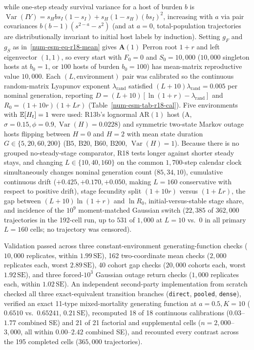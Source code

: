 while one-step steady survival variance for a host of burden $b$ is $\operatorname{Var}(I Y) = s_H b s_I(1 - s_I) + s_H(1 - s_H)(b s_I)^2$, increasing with $a$ via pair covariances $b(b - 1)(s^{2-a} - s^2)$ (and at $a = 0$, total-population trajectories are distributionally invariant to initial host labels by induction). Setting $g_F$ and $g_S$ as in~\eqref{num-esm-eq-r18-mean} gives $\mathbf{A}(1)$ Perron root $1 + r$ and left eigenvector $(1, 1)$, so every start with $F_0 = 0$ and $S_0 = 10{,}000$ ($10{,}000$ singleton hosts at $b_0 = 1$, or $100$ hosts of burden $b_0 = 100$) has mean-matrix reproductive value $10{,}000$. Each $(L, \text{environment})$ pair was calibrated so the continuous random-matrix Lyapunov exponent $\lambda_{\mathrm{rand}}$ satisfied $(L + 10)\lambda_{\mathrm{rand}} = 0.005$ per nominal generation, reporting $D = (L + 10)[\ln(1 + r) - \lambda_{\mathrm{rand}}]$ and $R_0 = (1 + 10r)(1 + Lr)$ (Table~\ref{num-esm-tab-r18-cal}). Five environments with $\mathbb{E}[H_t] = 1$ were used: R13b's lognormal $\mathrm{AR}(1)$ host ($\mathrm{A}$, $\sigma = 0.15, \phi = 0.9, \operatorname{Var}(H) = 0.0228$) and symmetric two-state Markov outage hosts flipping between $H = 0$ and $H = 2$ with mean state duration $G \in \{5, 20, 60, 200\}$ ($\mathrm{B5}$, $\mathrm{B20}$, $\mathrm{B60}$, $\mathrm{B200}$, $\operatorname{Var}(H) = 1$). Because there is no grouped no-steady-stage comparator, R18 tests longer against shorter steady stays, and changing $L \in \{10, 40, 160\}$ on the common $1{,}700$-step calendar clock simultaneously changes nominal generation count ($85, 34, 10$), cumulative continuous drift ($+0.425, +0.170, +0.050$, making $L = 160$ conservative with respect to positive drift), stage fecundity split $(1 + 10r)$ versus $(1 + Lr)$, the gap between $(L + 10)\ln(1 + r)$ and $\ln R_0$, initial-versus-stable stage share, and incidence of the $10^9$ moment-matched Gaussian switch ($22{,}385$ of $362{,}000$ trajectories in the 192-cell run, up to $531$ of $1{,}000$ at $L = 10$ vs.\ $0$ in all primary $L = 160$ cells; no trajectory was censored).

Validation passed across three constant-environment generating-function checks ($10{,}000$ replicates, within $1.99\,\mathrm{SE}$), 162 two-coordinate mean checks ($2{,}000$ replicates each, worst $2.89\,\mathrm{SE}$), 40 cohort gap checks ($20{,}000$ cohorts each, worst $1.92\,\mathrm{SE}$), and three forced-$10^3$ Gaussian outage return checks ($1{,}000$ replicates each, within $1.02\,\mathrm{SE}$). An independent second-party implementation from scratch checked all three exact-equivalent transition branches (\texttt{direct}, \texttt{pooled}, \texttt{dense}), verified an exact 11-type mixed-mortality generating function at $a = 0.5, K = 10$ ($0.6510$ vs.\ $0.65241$, $0.21\,\mathrm{SE}$), recomputed 18 of 18 continuous calibrations ($0.03$--$1.77$ combined SE) and 21 of 21 factorial and supplemental cells ($n = 2{,}000$--$3{,}000$, all within $0.00$--$2.42$ combined SE), and recounted every contrast across the 195 completed cells ($365{,}000$ trajectories).

